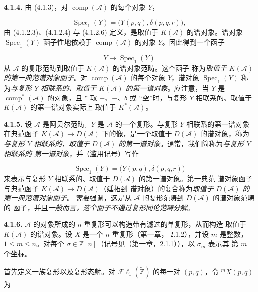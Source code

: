 \clearpage
{}%
\begingroup\small\setlength{\parskip}{0pt}\setlength{\emergencystretch}{1.5em}
\setlength{\abovedisplayskip}{4pt plus 2pt minus 2pt}%
\setlength{\belowdisplayskip}{4pt plus 2pt minus 2pt}%

\medskip\noindent\textbf{4.1.4.}\quad
由 (4.1.3)，对 $\operatorname{comp}(\mathcal A)$ 的每个对象 $Y$，

\[
\operatorname{Spec}_1(Y)=\bigl(Y(p,q),\delta(p,q,r)\bigr),
\]
由 (4.1.2.3)、(4.1.2.4) 与 (4.1.2.6) 定义，是取值于
$K(\mathcal A)$ 的谱对象。谱对象 $\operatorname{Spec}_1(Y)$ 函子性地依赖于
$\operatorname{comp}(\mathcal A)$ 的对象 $Y$。因此得到一个函子

\[
Y\longmapsto\operatorname{Spec}_1(Y)
\]
从 $\mathcal A$ 的复形范畴到取值于 $K(\mathcal A)$ 的谱对象范畴。这个函子
称为\emph{取值于 $K(\mathcal A)$ 的第一典范谱对象函子}。对
$\operatorname{comp}(\mathcal A)$ 的每个对象 $Y$，谱对象
$\operatorname{Spec}_1(Y)$ 称为\emph{与复形 $Y$ 相联系的、取值于
$K(\mathcal A)$ 的第一谱对象}。应注意，当 $Y$ 是
$\operatorname{comp}^{*}(\mathcal A)$ 的对象，且 $*$ 取 $+$、$-$、$b$ 或
“空”时，与复形 $Y$ 相联系的、取值于 $K(\mathcal A)$ 的第一谱对象实际上
取值于 $K^{*}(\mathcal A)$。

\medskip\noindent\textbf{4.1.5.}\quad
设 $\mathcal A$ 是阿贝尔范畴，$Y$ 是 $\mathcal A$ 的一个复形。与复形
$Y$ 相联系的第一谱对象在典范函子
$K(\mathcal A)\longrightarrow D(\mathcal A)$ 下的像，是一个取值于
$D(\mathcal A)$ 的谱对象，称为\emph{与复形 $Y$ 相联系的、取值于
$D(\mathcal A)$ 的第一谱对象}。通常，我们简称为\emph{与复形 $Y$ 相联系的
第一谱对象}，并（滥用记号）写作

\[
\operatorname{Spec}_1(Y)=\bigl(Y(p,q),\delta(p,q,r)\bigr)
\]
来表示与复形 $Y$ 相联系的、取值于 $D(\mathcal A)$ 的第一谱对象。第一典范
谱对象函子与典范函子 $K(\mathcal A)\longrightarrow D(\mathcal A)$（延拓到
谱对象）的复合称为\emph{取值于 $D(\mathcal A)$ 的第一典范谱对象函子}。
需要强调，这是从 $\mathcal A$ 的复形范畴到 $D(\mathcal A)$ 的谱对象范畴的
函子，并且\emph{一般而言，这个函子不通过复形同伦范畴分解}。

\medskip\noindent\textbf{4.1.6.}\quad
$\mathcal A$ 的对象所成的 $n$-重复形可以构造带有滤过的单复形，从而构造
取值于 $K(\mathcal A)$ 的谱对象。设 $X$ 是一个 $n$-重复形（第一章，
2.1.2），并设 $m$ 是整数，$1\leq m\leq n$。对每个
$\sigma\in\mathbb Z[n]$（记号见（第一章，2.1.1）），以 $\sigma_m$ 表示其
第 $m$ 个坐标。

首先定义一族复形以及复形态射。对
$\mathcal{F}\ell_1(\widetilde{\mathbb Z})$ 的每一对 $(p,q)$，令
${}^{m}X(p,q)$ 为
\endgroup
